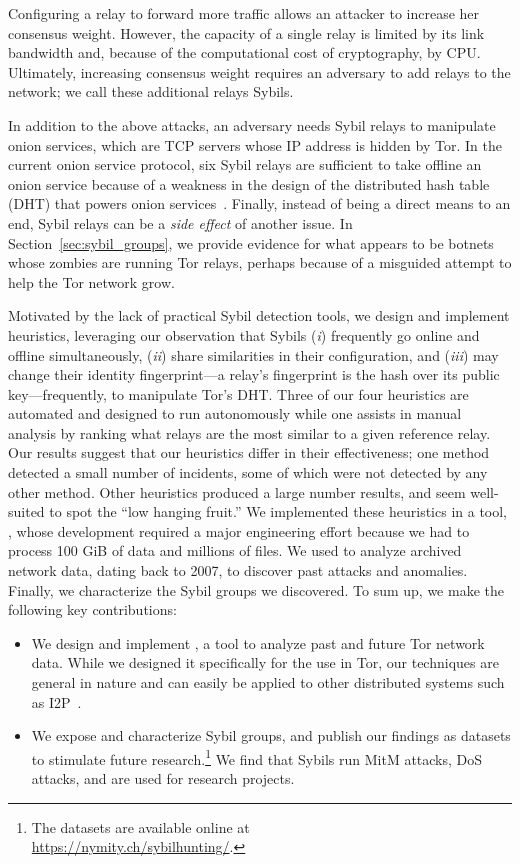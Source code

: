 Configuring a relay to forward more traffic allows an attacker to increase her
consensus weight.  However, the capacity of a single relay is limited by its
link bandwidth and, because of the computational cost of cryptography, by CPU.
Ultimately, increasing consensus weight requires an adversary to add relays to
the network; we call these additional relays Sybils.

In addition to the above attacks, an adversary needs Sybil relays to manipulate
onion services, which are TCP servers whose IP address is hidden by Tor.  In the
current onion service protocol, six Sybil relays are sufficient to take offline
an onion service because of a weakness in the design of the distributed hash
table (DHT) that powers onion services~\cite[\S~V]{Biryukov2013a}.  Finally,
instead of being a direct means to an end, Sybil relays can be a \emph{side
effect} of another issue.  In Section~\ref{sec:sybil_groups}, we provide
evidence for what appears to be botnets whose zombies are running Tor relays,
perhaps because of a misguided attempt to help the Tor network grow.

Motivated by the lack of practical Sybil detection tools, we design and
implement heuristics, leveraging our observation that Sybils (\emph{i})
frequently go online and offline simultaneously, (\emph{ii}) share similarities
in their configuration, and (\emph{iii}) may change their identity
fingerprint---a relay's fingerprint is the hash over its public
key---frequently, to manipulate Tor's DHT.  Three of our four heuristics are
automated and designed to run autonomously while one assists in manual analysis
by ranking what relays are the most similar to a given reference relay.  Our
results suggest that our heuristics differ in their effectiveness; one method
detected a small number of incidents, some of which were not detected by any
other method.  Other heuristics produced a large number results, and seem
well-suited to spot the ``low hanging fruit.'' We implemented these heuristics
in a tool, \sys, whose development required a major engineering effort because
we had to process 100 GiB of data and millions of files.  We used \sys to
analyze archived network data, dating back to 2007, to discover past attacks and
anomalies.  Finally, we characterize the Sybil groups we discovered.  To sum up,
we make the following key contributions:
\begin{itemize}
	\item We design and implement \sys, a tool to analyze past and future Tor
		network data.  While we designed it specifically for the use in Tor, our
		techniques are general in nature and can easily be applied to other
		distributed systems such as I2P~\cite{i2p}.
	\item We expose and characterize Sybil groups, and publish our findings as
		datasets to stimulate future research.\footnote{The datasets are
		available online at\\\url{https://nymity.ch/sybilhunting/}.} We find
		that Sybils run MitM attacks, DoS attacks, and are used for research
		projects.
\end{itemize}

